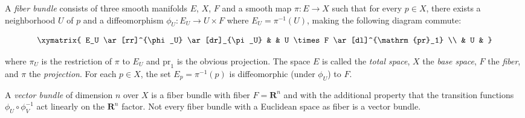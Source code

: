 A \textit{fiber bundle} consists of three smooth manifolds $E$, $X$, $F$ and a smooth map $\pi: E \to X$ such that for every $p \in X$, there exists a neighborhood $U$ of $p$ and a diffeomorphism $\phi_U: E_U \to U \times F$ where $E_U = \pi^{-1}(U)$, making the following diagram commute:

$$\xymatrix{
E_U \ar[rr]^{\phi_U} \ar[dr]_{\pi_U} & & U \times F \ar[dl]^{\mathrm{pr}_1} \\
& U &
}$$

where $\pi_U$ is the restriction of $\pi$ to $E_U$ and $\mathrm{pr}_1$ is the obvious projection. The space $E$ is called the \textit{total space}, $X$ the \textit{base space}, $F$ the \textit{fiber}, and $\pi$ the \textit{projection}. For each $p \in X$, the set $E_p = \pi^{-1}(p)$ is diffeomorphic (under $\phi_U$) to $F$.

A \textit{vector bundle} of dimension $n$ over $X$ is a fiber bundle with fiber $F = \mathbf{R}^n$ and with the additional property that the transition functions $\phi_U \circ \phi_V^{-1}$ act linearly on the $\mathbf{R}^n$ factor. Not every fiber bundle with a Euclidean space as fiber is a vector bundle.
